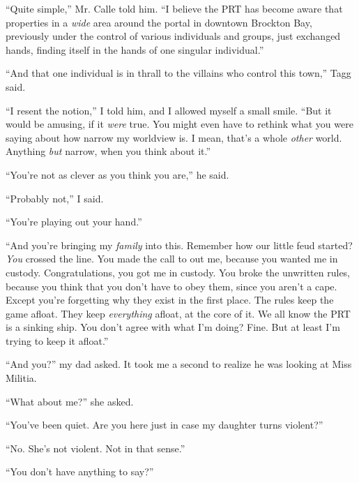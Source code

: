``Quite simple,'' Mr. Calle told him.  ``I believe the PRT has become aware that properties in a \emph{wide} area around the portal in downtown Brockton Bay, previously under the control of various individuals and groups, just exchanged hands, finding itself in the hands of one singular individual.''



``And that one individual is in thrall to the villains who control this town,'' Tagg said.



``I resent the notion,'' I told him, and I allowed myself a small smile.  ``But it would be amusing, if it \emph{were} true.  You might even have to rethink what you were saying about how narrow my worldview is.  I mean, that's a whole \emph{other} world.  Anything \emph{but} narrow, when you think about it.''



``You're not as clever as you think you are,'' he said.



``Probably not,'' I said.



``You're playing out your hand.''



``And you're bringing my \emph{family} into this.  Remember how our little feud started?  \emph{You} crossed the line.  You made the call to out me, because you wanted me in custody.  Congratulations, you got me in custody.  You broke the unwritten rules, because you think that you don't have to obey them, since you aren't a cape.  Except you're forgetting why they exist in the first place.  The rules keep the game afloat.  They keep \emph{everything} afloat, at the core of it.  We all know the PRT is a sinking ship.  You don't agree with what I'm doing?  Fine.  But at least I'm trying to keep it afloat.''



``And you?'' my dad asked.  It took me a second to realize he was looking at Miss Militia.



``What about me?'' she asked.



``You've been quiet.  Are you here just in case my daughter turns violent?''



``No.  She's not violent.  Not in that sense.''



``You don't have anything to say?''



